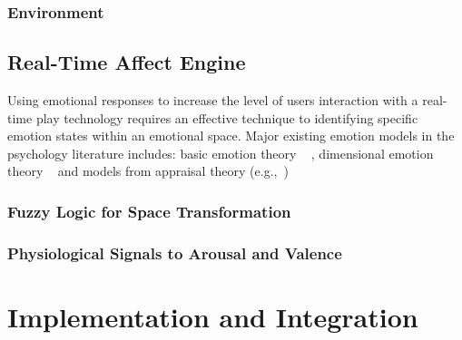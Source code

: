 \documentclass{uofsthesis-cs}
\begin{document}
\subsection{Environment}


\section{Real-Time Affect Engine}

Using emotional responses to increase the level of users interaction with a real-time play technology requires an effective technique to identifying specific emotion states within an emotional space. Major existing emotion models in the psychology literature includes: basic emotion theory ~\cite{ekman1992argument, ekman1992there} , dimensional emotion theory ~\cite{lang1995emotion, russell1980circumplex} and models from appraisal theory (e.g.,~\cite{roseman2001model}) ~\cite{zhang2010service}


\subsection{Fuzzy Logic for Space Transformation}
\subsection{Physiological Signals to Arousal and Valence}


\chapter{Implementation and Integration}
\label{chap:impl}

\end{document}
